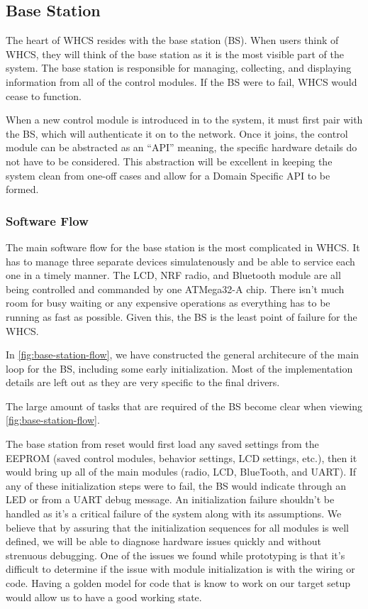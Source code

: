 \subsection{Base Station}
The heart of WHCS resides with the base station (BS). When users think of WHCS, they
will think of the base station as it is the most visible part of the system.
The base station is responsible for managing, collecting, and displaying
information from all of the control modules. If the BS were to fail, WHCS
would cease to function.

When a new control module is introduced in to the system, it must first pair
with the BS, which will authenticate it on to the network. Once it joins, the
control module can be abstracted as an ``API'' meaning, the specific hardware
details do not have to be considered. This abstraction will be excellent in
keeping the system clean from one-off cases and allow for a Domain Specific API
to be formed.

\subsubsection{Software Flow}
The main software flow for the base station is the most complicated in WHCS. It
has to manage three separate devices simulatenously and be able to service each
one in a timely manner. The LCD, NRF radio, and Bluetooth module are all being
controlled and commanded by one ATMega32-A chip. There isn't much room for busy
waiting or any expensive operations as everything has to be running as fast as
possible. Given this, the BS is the least point of failure for the WHCS.

In \autoref{fig:base-station-flow}, we have constructed the general architecure
of the main loop for the BS, including some early initialization. Most of the
implementation details are left out as they are very specific to the final
drivers.


The large amount of tasks that are required of the BS become clear when viewing
\autoref{fig:base-station-flow}.

The base station from reset would first load any saved settings from the
EEPROM (saved control modules, behavior settings, LCD settings, etc.), then it
would bring up all of the main modules (radio, LCD, BlueTooth, and UART). If
any of these initialization steps were to fail, the BS would indicate through
an LED or from a UART debug message. An initialization failure shouldn't be
handled as it's a critical failure of the system along with its assumptions. We
believe that by assuring that the initialization sequences for all modules is
well defined, we will be able to diagnose hardware issues quickly and without
strenuous debugging. One of the issues we found while prototyping is that it's
difficult to determine if the issue with module initialization is with the
wiring or code. Having a golden model for code that is know to work on our
target setup would allow us to have a good working state.


